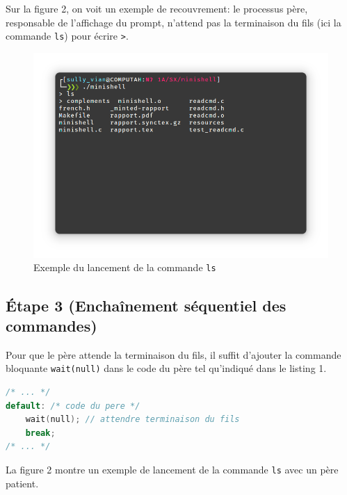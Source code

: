 \documentclass{article}
\begin{document}
Sur la figure 2, on voit un exemple de recouvrement: le processus père, responsable de l'affichage du prompt, n'attend pas la terminaison du fils (ici la commande \texttt{ls}) pour écrire \texttt{>}.

\begin{figure}[H]
    \centering
    \includegraphics[width=1\textwidth]{./resources/E2.png}
    \caption{Exemple du lancement de la commande \texttt{ls}}
    \label{fig:E2}
\end{figure}

\subsection*{Étape 3 (Enchaînement séquentiel des commandes)}

Pour que le père attende la terminaison du fils, il suffit d'ajouter la commande bloquante \texttt{wait(null)} dans le code du père tel qu'indiqué dans le listing 1.

\begin{lstlisting}[language=C, caption=Ajout pour la question 3]
/* ... */
default: /* code du pere */
    wait(null); // attendre terminaison du fils
    break;
/* ... */
\end{lstlisting}

La figure 2 montre un exemple de lancement de la commande \texttt{ls} avec un père patient.
\end{document}

